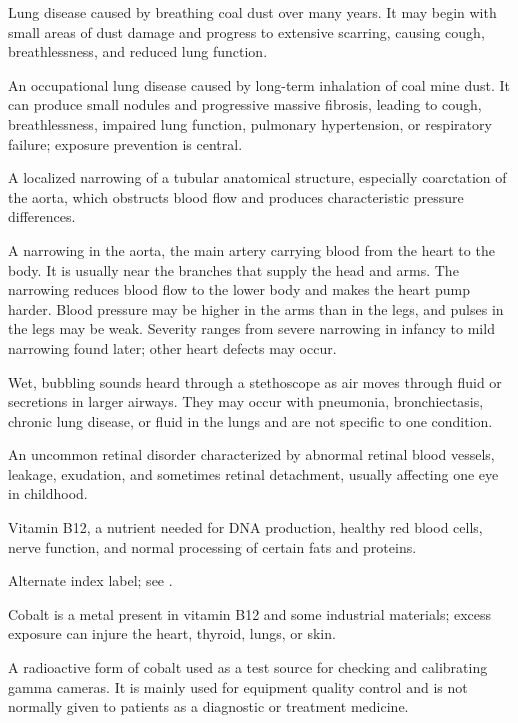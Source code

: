  Lung disease caused by breathing coal dust over many years. It may begin with small areas of dust damage and progress to extensive scarring, causing cough, breathlessness, and reduced lung function.

 An occupational lung disease caused by long-term inhalation of coal mine dust. It can produce small nodules and progressive massive fibrosis, leading to cough, breathlessness, impaired lung function, pulmonary hypertension, or respiratory failure; exposure prevention is central.

 A localized narrowing of a tubular anatomical structure, especially coarctation of the
aorta, which obstructs blood flow and produces characteristic pressure differences.

 A narrowing in the aorta, the main artery carrying blood from the heart to the body. It is
usually near the branches that supply the head and arms. The narrowing reduces blood flow to the lower body and makes
the heart pump harder. Blood pressure may be higher in the arms than in the legs, and pulses in the legs may be weak.
Severity ranges from severe narrowing in infancy to mild narrowing found later; other heart defects may occur.

 Wet, bubbling sounds heard through a stethoscope as air moves through fluid or secretions in larger airways. They may occur with pneumonia, bronchiectasis, chronic lung disease, or fluid in the lungs and are not specific to one condition.

 An uncommon retinal disorder characterized by abnormal retinal blood vessels, leakage,
exudation, and sometimes retinal detachment, usually affecting one eye in childhood.

 Vitamin B12, a nutrient needed for DNA production, healthy red blood cells, nerve function, and normal processing of certain fats and proteins.

 Alternate index label; see .

 Cobalt is a metal present in vitamin B12 and some industrial materials; excess exposure can injure the heart, thyroid, lungs, or skin.

 A radioactive form of cobalt used as a test source for checking and calibrating gamma cameras. It is mainly used for equipment quality control and is not normally given to patients as a diagnostic or treatment medicine.

